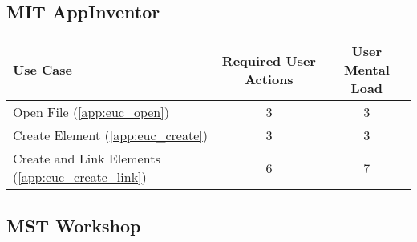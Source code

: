 \subsection*{MIT AppInventor}




\begin{tabularx}{\textwidth}{Xcc}
\textbf{Use Case} & \textbf{Required User Actions} & \textbf{User Mental Load}\\
\hline
Open File (\ref{app:euc_open})                       & 3 & 3 \\
Create Element (\ref{app:euc_create})                & 3 & 3 \\
Create and Link Elements (\ref{app:euc_create_link}) & 6 & 7
\end{tabularx}

\subsection*{MST Workshop}



